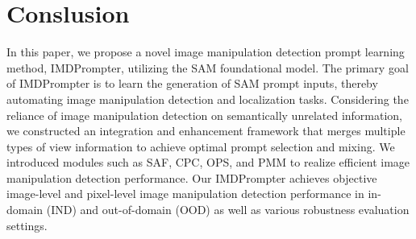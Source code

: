 \section{Conslusion}
In this paper, we propose a novel image manipulation detection prompt learning method, IMDPrompter, utilizing the SAM foundational model. The primary goal of IMDPrompter is to learn the generation of SAM prompt inputs, thereby automating image manipulation detection and localization tasks. Considering the reliance of image manipulation detection on semantically unrelated information, we constructed an integration and enhancement framework that merges multiple types of view information to achieve optimal prompt selection and mixing. We introduced modules such as SAF, CPC, OPS, and PMM to realize efficient image manipulation detection performance. Our IMDPrompter achieves objective image-level and pixel-level image manipulation detection performance in in-domain (IND) and out-of-domain (OOD) as well as various robustness evaluation settings.





